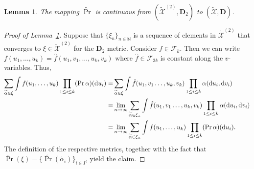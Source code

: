 \documentclass[a4paper,11pt]{amsart}
\numberwithin{equation}{section}
\newtheorem{lemma}[theorem]{Lemma}
\newcommand{\cF}{{\ensuremath{\mathcal F}} }
\newcommand{\cX}{{\ensuremath{\mathcal X}} }
\newcommand{\ga}{\alpha}
\newcommand{\bfD}{\mathbf{D}}
\renewcommand{\tilde}{\widetilde}          %
\newcommand{\dd}{\text{\rm d}}             %
\newcommand{\N}{\mathbb{N}}
\newcommand{\8}{\infty}
\newcommand{\beq}{\begin{equation}}
\newcommand{\eeq}{\end{equation}}
\newcommand{\ba}{\begin{aligned}}
\newcommand{\ea}{\end{aligned}}
\begin{document}
\begin{lemma}
\label{lem:continuity-pi}
The mapping $\tilde\Pr$ is continuous from $(\tilde \cX^{(2)},\bfD_2)$ to $(\tilde \cX,\bfD)$.
\end{lemma}
\begin{proof}[Proof of Lemma~\ref{lem:continuity-pi}]
Suppose that $\{\xi_n\}_{n\in\N}$ is a sequence of elements in $\tilde\cX^{(2)}$ that converges to $\xi\in\tilde \cX^{(2)}$ for the $\mathbf{D}_2$ metric. Consider $f\in\cF_k$. Then we can write $f(u_1, \ldots, u_k) = \hat f (u_1, v_1, \ldots, u_k, v_k)$ where $\hat f \in \cF_{2k}$ is constant along the $v$-variables. Thus,
\beq
\ba
\sum_{\tilde{\ga}\in\xi}\int f(u_1, \ldots, u_k) \prod_{1\le i\le k} (\Pr\ga)(\dd u_i)
=& \sum_{\tilde{\ga}\in\xi}\int \hat f(u_1, v_1 \ldots, u_k, v_k) \prod_{1\le i\le k} \ga(\dd u_i, \dd v_i)\\
= &\lim_{n\to\infty}\sum_{\tilde{\ga}\in\xi_n} \int \hat f(u_1, v_1 \ldots, u_k, v_k) \prod_{1\le i\le k} \ga(\dd u_i, \dd v_i)\\
= &\lim_{n\to\infty} \sum_{\tilde{\ga}\in\xi_n}\int f(u_1,\ldots, u_k) \prod_{1\le i\le k} (\Pr\ga)(\dd u_i).
\ea
\eeq
The definition of the respective metrics, together with the fact that $\tilde\Pr(\xi)=\{\tilde\Pr(\tilde\ga_i)\}_{i\in I}$, yield the claim.
\end{proof}
%
\end{document}
